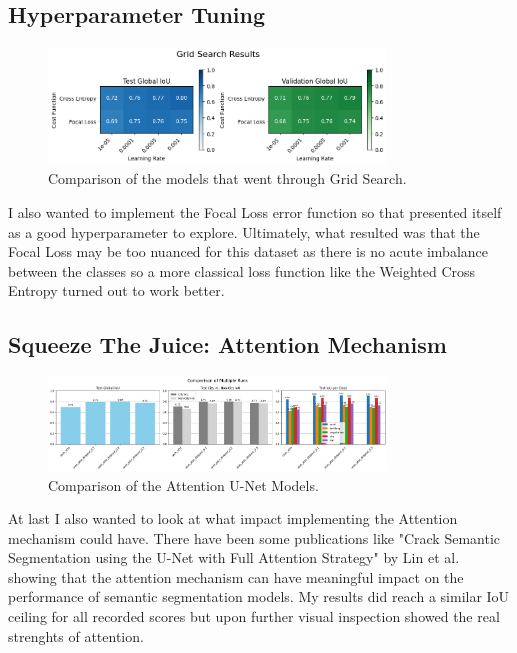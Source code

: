 \subsection{Hyperparameter Tuning}

\begin{figure}[h] 
    \centering 
    \includegraphics[width=0.8\textwidth]{figures/grid_search.png} 
    \caption{Comparison of the models that went through Grid Search.} 
    \label{fig:grid_search} 
\end{figure}

I also wanted to implement the Focal Loss error function so that presented itself as a good hyperparameter to explore. Ultimately, what resulted was that the Focal Loss may be too nuanced for this dataset as there is no acute imbalance between the classes so a more classical loss function like the Weighted Cross Entropy turned out to work better.

\subsection{Squeeze The Juice: Attention Mechanism}
\label{sec:squeeze_the_juice}

\begin{figure}[h] 
    \centering 
    \includegraphics[width=0.8\textwidth]{figures/attention_comparison.png} 
    \caption{Comparison of the Attention U-Net Models.} 
    \label{fig:attention_comparison} 
\end{figure}

At last I also wanted to look at what impact implementing the Attention mechanism could have. There have been some publications like "Crack Semantic Segmentation using the U-Net with
Full Attention Strategy" by Lin et al. \cite{linCrackSemanticSegmentation2021} showing that the attention mechanism can have meaningful impact on the performance of semantic segmentation models. My results did reach a similar IoU ceiling for all recorded scores but upon further visual inspection showed the real strenghts of attention.